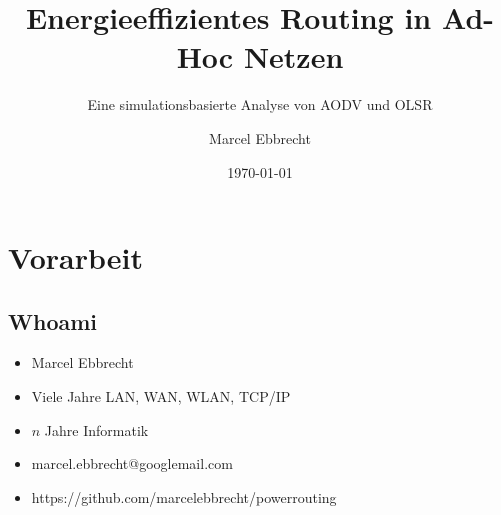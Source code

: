 \documentclass[11pt,landscape]{beamer}
\title{Energieeffizientes Routing in Ad-Hoc Netzen}
\subtitle{Eine simulationsbasierte Analyse von AODV und OLSR}
\author{Marcel Ebbrecht}
\institute{TU Dortmund, Bachelorabschlussvortrag}
\date{\today}
\begin{document}
\setlength{\parskip}{1mm}

\begin{frame}[c,label=titlepage]
  \titlepage
\end{frame}

\logo{}
  \setcounter{tocdepth}{1}


\section{Vorarbeit}

\subsection{Whoami}

\begin{frame}{\insertsubsection}
\begin{itemize}
\item Marcel Ebbrecht\newline
\item Viele Jahre LAN, WAN, WLAN, TCP/IP\newline
\item $n$ Jahre Informatik\newline
\item marcel.ebbrecht@googlemail.com\newline
\item https://github.com/marcelebbrecht/powerrouting
\end{itemize}
\end{frame}



\end{document}
